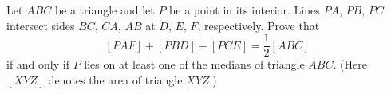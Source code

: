 Let $ABC$ be a triangle and let $P$ be a point in its interior. Lines $PA$, $PB$, $PC$ intersect sides $BC$, $CA$, $AB$ at $D$, $E$, $F$, respectively. Prove that \[ [PAF]+[PBD]+[PCE]=\frac{1}{2}[ABC]  \] if and only if $P$ lies on at least one of the medians of triangle $ABC$. (Here $[XYZ]$ denotes the area of triangle $XYZ$.)